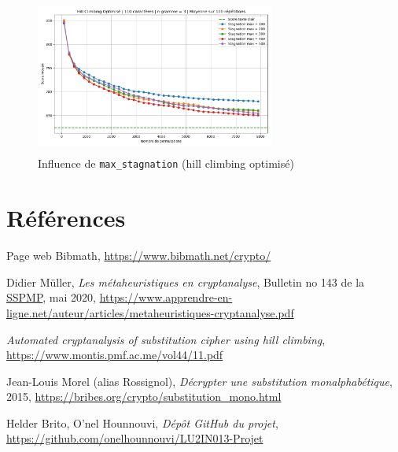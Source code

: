 \documentclass[a4paper]{article}
\begin{document}
\begin{figure}[H]
    \centering
    \includegraphics[width=0.7\textwidth, height=5.1cm]{hillclimbOpt_n3_taille110.png}
    \caption{Influence de \texttt{max\_stagnation} (hill climbing optimisé) }
    \label{fig:hc_optimise_stagnations}
\end{figure}

\clearpage
{}\label{sec:annexes}
\section*{Références}

\begin{enumerate}[label={[\arabic*]}]
    \item Page web Bibmath, \url{https://www.bibmath.net/crypto/}
    \item Didier Müller, \textit{Les métaheuristiques en cryptanalyse},  Bulletin no 143 de la \href{https://www.vsmp.ch/}{SSPMP}, mai 2020, \url{https://www.apprendre-en-ligne.net/auteur/articles/metaheuristiques-cryptanalyse.pdf}
    \item \textit{Automated cryptanalysis of substitution cipher using hill climbing}, \url{https://www.montis.pmf.ac.me/vol44/11.pdf}
    \item Jean-Louis Morel (alias Rossignol), \textit{Décrypter une substitution monalphabétique}, 2015, \url{https://bribes.org/crypto/substitution_mono.html}
    \item Helder Brito, O'nel Hounnouvi, \textit{Dépôt GitHub du projet}, \url{https://github.com/onelhounnouvi/LU2IN013-Projet}
\end{enumerate}
\end{document}
